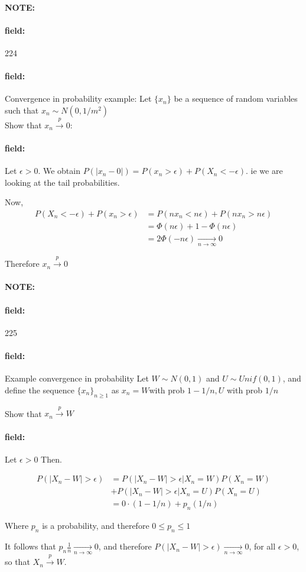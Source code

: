 \documentclass[12pt]{article}
\newenvironment{note}{\paragraph{NOTE:}}{}
\newenvironment{field}{\paragraph{field:}}{}
\begin{document}
\begin{note} \begin{field} \tiny 224 \end{field}
  \begin{field}
    Convergence in probability example:
    Let $\{x_n\}$ be a sequence of random variables such that $x_n \sim N(0,1/m^2)$\\
    Show that $x_n \overset{p}{\to} 0$:
  \end{field}
  \begin{field}
    Let $\epsilon > 0$. We obtain $P(|x_n - 0|) = P(x_n > \epsilon) + P(X_n < -\epsilon )$. ie we are looking at the tail probabilities.

    Now,
    \begin{align*}
      P(X_n < -\epsilon) + P(x_n > \epsilon) &=
      P(nx_n < n\epsilon) + P(nx_n > n\epsilon)\\
      &= \Phi(n\epsilon) + 1 - \Phi(n \epsilon)\\
      &= 2\Phi(-n\epsilon) \underset{n\to \infty}{\to}  0
    \end{align*}

    Therefore $x_n \overset{p}{\to} 0$
  \end{field}
\end{note}


\begin{note} \begin{field} \tiny 225 \end{field}
  \begin{field}
    Example convergence in probability
    Let $W \sim N(0,1)$ and $U \sim Unif(0,1)$, and define the sequence $\{x_n\}_{n \geq 1}$ as $x_n = W $with prob $1 - 1/n, U$ with prob $ 1/n$

    Show that $x_n \overset{p}{\to} W $

  \end{field}
  \begin{field}
    Let $\epsilon > 0$ Then.

    \begin{align*}
      P(|X_n - W| > \epsilon) &= P(|X_n - W| > \epsilon | X_n = W)P(X_n = W) \\
      &+ P(|X_n - W| > \epsilon | X_n = U)P(X_n = U)\\
      &= 0 \cdot (1 - 1/n) + p_n (1/n)
    \end{align*}

    Where $p_n  $ is a probability, and therefore $0 \leq p_n \leq 1 $

    It follows that $p_n \frac{1}{n} \underset{n \to \infty}{\to} 0$, and therefore $P(|X_n - W| > \epsilon ) \underset{n \to \infty}{\to} 0$, for all $\epsilon > 0$, so that $X_n \overset{p}{\to} W$.
  \end{field}
\end{note}
\end{document}
